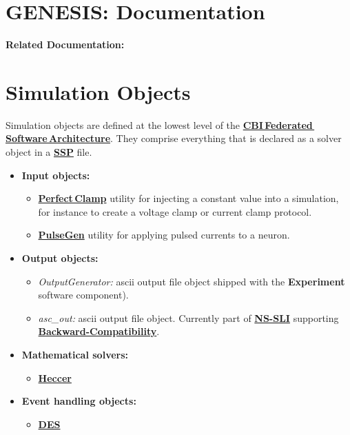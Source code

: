 \documentclass[12pt]{article}
\begin{document}
\section*{GENESIS: Documentation}

{\bf Related Documentation:}

\section*{Simulation Objects}

Simulation objects are defined at the lowest level of the
\href{../genesis-overview/genesis-overview.tex}{\bf
  CBI\,Federated\,Software\,Architecture}.  They comprise everything
that is declared as a solver object in a \href{../ssp/ssp.tex}{\bf
  SSP} file.

\begin{itemize}

\item {\bf Input objects:}
   \begin{itemize}
   \item \href{../pclamp/pclamp.tex}{\bf Perfect\,Clamp} utility for
     injecting a constant value into a simulation, for instance to
     create a voltage clamp or current clamp protocol.
   \item \href{../pulsegen/pulsegen.tex}{\bf PulseGen} utility for
     applying pulsed currents to a neuron.
   \end{itemize}
   
\item {\bf Output objects:}
   \begin{itemize}
   \item {\it OutputGenerator:} ascii output file object shipped with
     the {\bf Experiment} software component).
   \item {\it asc\_out:} ascii output file object.  Currently part of
     \href{../ns-sli/ns-sli.tex}{\bf NS-SLI} supporting
     \href{../backward-compatibility/backward-compatibility.tex}{\bf
       Backward-Compatibility}.
   \end{itemize}

\item{\bf Mathematical solvers:}
   \begin{itemize}
      \item \href{../heccer/heccer.tex}{\bf Heccer}
   \end{itemize}
   
\item{\bf Event handling objects:}
   \begin{itemize}
      \item \href{../des/des.tex}{\bf DES}
   \end{itemize}
   
\end{itemize}
\end{document}
